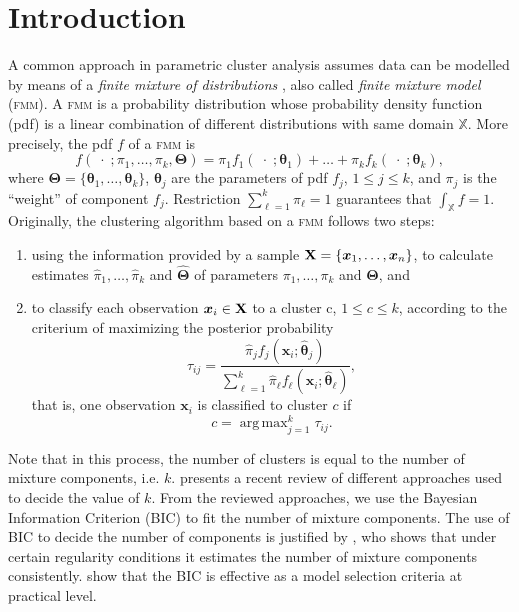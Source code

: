 \documentclass[submit]{smj}
\DeclareMathOperator*{\argmax}{arg\,max}
\theoremstyle{definition}
\newcommand{\m}[1]{\boldsymbol{#1}}
\newcommand{\fmm}{\textsc{fmm}\xspace}
\newcommand{\X}{\text{\textbf{X}}}
\begin{document}



\maketitle

\section{Introduction}


A common approach in parametric cluster analysis assumes data can be modelled by means of a \emph{finite mixture of distributions} \citep{fraley2002model, punzo2014flexible}, also called \emph{finite mixture model} (\fmm). A \fmm is a probability distribution whose probability density function (pdf) is a linear combination of different distributions with same domain $\mathbb{X}$. More precisely, the pdf $f$ of a \fmm is
\begin{equation}\label{mixt}
f(\;\cdot\; ; \pi_1, \dots, \pi_k, \m\Theta) = \pi_1 f_1(\;\cdot\; ; \m\theta_1) + \dots + \pi_k f_k(\;\cdot\; ; \m\theta_k),
\end{equation}
where $\m\Theta =\{ \m\theta_1, \dots, \m\theta_k\}$, $\m\theta_j$ are the parameters of pdf $f_j$, $1\leq j \leq k$, and $\pi_j$ is the ``weight'' of component $f_j$. Restriction $\sum_{\ell = 1}^k \pi_\ell = 1$ guarantees that  $\int_{\mathbb{X}}f = 1$. Originally, the clustering algorithm based on a \fmm follows two steps:
\begin{enumerate}
\item using the information provided by a sample $\X=\{\m x_1, \dots, \m x_n\}$, to calculate estimates $\hat{\pi}_1, \dots, \hat{\pi}_k$ and $\hat{\m\Theta}$ of parameters $\pi_1, \dots, \pi_k$ and $\m\Theta$, and
\item to classify each observation $\m x_i \in \X$ to a cluster c, $1\leq c \leq k$, according to the criterium of maximizing the posterior probability
\[
\tau_{ij}= \frac{ \hat{\pi}_j f_j(\m x_i ; \hat{\m\theta}_j) }{\sum_{\ell=1}^k \hat{\pi}_\ell f_\ell(\m x_i ; \hat{\m\theta}_\ell) },
\]
that is, one observation $\m x_i$ is classified to cluster $c$ if
\begin{equation}\label{map_criteria}
c = \argmax_{j=1}^k \tau_{ij}.
\end{equation}
\end{enumerate}
Note that in this process, the number of clusters is equal to the number of mixture components, i.e.  $k$. \cite{mclachlan2014components} presents a recent review of different approaches used to decide the value of $k$. From the reviewed approaches, we use the Bayesian Information Criterion (BIC) to fit the number of mixture components. The use of BIC to decide the number of components is justified by \cite{keribin1998consistent, keribin2000consistent}, who shows that under certain regularity conditions it estimates the number of mixture components consistently. \cite{fraley1998how} show that the BIC is effective as a model selection criteria  at practical level.
\end{document}
